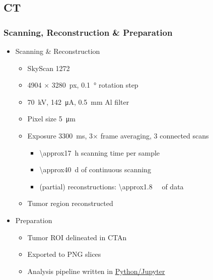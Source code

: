 \documentclass[final]{beamer}
\newcommand{\uct}{\si{\micro}CT\xspace} %
\begin{document}
\subsection{\uct}
\begin{frame}
	\frametitle{Scanning, Reconstruction \& Preparation}
	\begin{itemize}
		\item Scanning \& Reconstruction 
		\begin{itemize}
			\item SkyScan 1272
			\item 4904 \(\times\) \SI{3280}{px}, \SI{0.1}{\degree} rotation step
			\item \SI{70}{\kilo\volt}, \SI{142}{\micro\ampere}, \SI{0.5}{\milli\meter} Al filter
			\item Pixel size \SI{5}{\micro\meter}
			\item Exposure \SI{3300}{\milli\second}, 3\(\times\) frame averaging, 3 connected scans
			\begin{itemize}
				\item \SI{\approx17}{\hour} scanning time per sample
				\item \SI{\approx40}{\day} of continuous scanning
				\item (partial) reconstructions: \SI{\approx1.8}{\tera\byte} of data
			\end{itemize}
			\item Tumor region reconstructed%
		\end{itemize}
		\item Preparation
		\begin{itemize}
			\item Tumor ROI delineated in CTAn 
			\item Exported to PNG slices
			\item Analysis pipeline written in \href{http://github.com/habi/grenoble-brains}{Python/Jupyter}
		\end{itemize}
	\end{itemize}
\end{frame}
\end{document}
